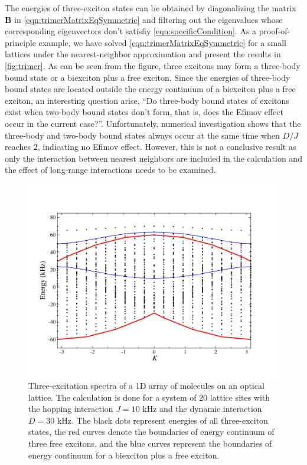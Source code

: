 The energies of three-exciton states can be obtained by diagonalizing the matrix $\mathbf{B}$ in
 \autoref{eqn:trimerMatrixEqSymmetric} and filtering out the eigenvalues whose corresponding eigenvectors don't
 satisfiy \autoref{eqn:specificCondition}. As a proof-of-principle example, we have solved
 \autoref{eqn:trimerMatrixEqSymmetric} for a small lattices under the nearest-neighbor approximation and present
 the results  in \autoref{fig:trimer}. As can be seen from the figure, three excitons may
form a three-body bound state or a biexciton plus a free exciton. Since the energies of three-body bound states are
located outside the energy continuum of a biexciton plus a free exciton, an interesting question arise, ``Do
three-body bound states of excitons exist when two-body bound states don't form, that is, does the Efimov effect
 occur in the current case?''. Unfortunately, numerical investigation shows that the three-body and
 two-body bound states always occur at the same time when $D/J$ reaches 2, indicating no Efimov effect. However,
this is not a conclusive result as only the interaction between nearest neighbors are included in the calculation and 
the effect of long-range interactions needs to be examined.

 

\begin{figure}[htbp]
\centering
\includegraphics[width=\linewidth]{threeExcitons.pdf}
\caption{Three-excitation spectra of a 1D array of molecules on an optical lattice. The calculation is done for a
 system of 20 lattice sites with the hopping interaction $J =10$ kHz and the dynamic interaction $D =30$ kHz.
The black dots represent energies of all three-exciton states, the red curves denote the boundaries of  energy
 continuum of three free excitons, and the blue curves represent the boundaries of energy continuum for a biexciton 
plus a free exciton. 
   }
\label{fig:trimer}
\end{figure}


